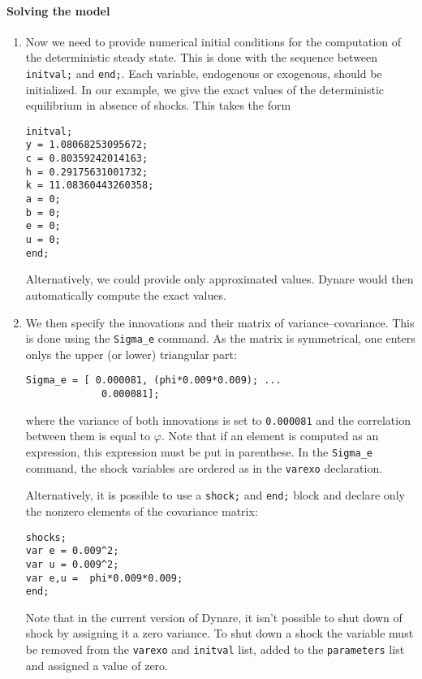 \documentclass[11pt,a4paper]{article}
\begin{document}
\paragraph{Solving the model}
\begin{enumerate} 
\item Now we need to provide numerical initial conditions for the computation of the deterministic steady state. This is done with the sequence between {\tt initval;} and {\tt end;}. Each variable, endogenous or exogenous, should be initialized. In our example, we give the exact values of the deterministic equilibrium in absence of shocks. This takes the form
\begin{verbatim}
initval;
y = 1.08068253095672;
c = 0.80359242014163;
h = 0.29175631001732;
k = 11.08360443260358;
a = 0;
b = 0;
e = 0;
u = 0;
end;
\end{verbatim}

Alternatively, we could provide only approximated values. {\sc Dynare} would then automatically compute the exact values.

\item We then specify the innovations and their matrix of variance--covariance. This is done using the {\tt Sigma\_e} command. As the matrix is symmetrical, one enters onlys the upper (or lower) triangular part:
\begin{verbatim}
Sigma_e = [ 0.000081, (phi*0.009*0.009); ...
             0.000081];
\end{verbatim}
where the variance of both innovations is set to {\tt 0.000081} and the correlation between them is equal to $\varphi$. Note that if an element is computed as an expression, this expression must be put in parenthese. In the {\tt Sigma\_e} command, the shock variables are ordered as in the {\tt varexo} declaration.
 
Alternatively, it is possible to use a {\tt shock;} and {\tt end;} block and declare only the nonzero elements of the covariance matrix:
\begin{verbatim}
shocks;
var e = 0.009^2;
var u = 0.009^2;
var e,u =  phi*0.009*0.009;
end; 
\end{verbatim}
Note that in the current version of {\sc Dynare}, it isn't possible to shut down of shock by assigning it a zero variance. To shut down a shock the variable must be removed from the {\tt varexo} and {\tt initval} list, added to the {\tt parameters} list and assigned a value of zero.


\end{enumerate}
\end{document}
